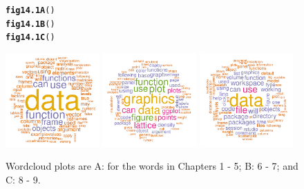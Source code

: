 \documentclass[12pt, a4paper,  BCOR=8.25mm, DIV=15]{scrartcl}\usepackage[]{graphicx}\usepackage[]{color}
\makeatletter
\newcommand{\hlstd}[1]{\textcolor[rgb]{0.345,0.345,0.345}{#1}}%
\newcommand{\hlkwd}[1]{\textcolor[rgb]{0.737,0.353,0.396}{\textbf{#1}}}%
\newenvironment{kframe}{%
 \def\at@end@of@kframe{}%
 \ifinner\ifhmode%
  \def\at@end@of@kframe{\end{minipage}}%
  \begin{minipage}{\columnwidth}%
 \fi\fi%
 \def\FrameCommand##1{\hskip\@totalleftmargin \hskip-\fboxsep
 \colorbox{shadecolor}{##1}\hskip-\fboxsep
     \hskip-\linewidth \hskip-\@totalleftmargin \hskip\columnwidth}%
 \MakeFramed {\advance\hsize-\width
   \@totalleftmargin\z@ \linewidth\hsize
   \@setminipage}}%
 {\par\unskip\endMakeFramed%
 \at@end@of@kframe}
\newenvironment{knitrout}{}{} %
\makeatother
\begin{document}
\begin{figure}
\begin{knitrout}
\color{fgcolor}\begin{kframe}
\begin{alltt}
\hlkwd{fig14.1A}\hlstd{()}
\hlkwd{fig14.1B}\hlstd{()}
\hlkwd{fig14.1C}\hlstd{()}
\end{alltt}
\end{kframe}

{\centering \includegraphics[width=0.32\textwidth]{figs/tm-wc-14_1x-1} 
\includegraphics[width=0.32\textwidth]{figs/tm-wc-14_1x-2} 
\includegraphics[width=0.32\textwidth]{figs/tm-wc-14_1x-3} 

}



\end{knitrout}

\caption{Wordcloud plots are A: for the words in Chapters 1 - 5; B: 6 -
  7; and C: 8 - 9.\label{fig:wc}}
\end{figure}
\end{document}
